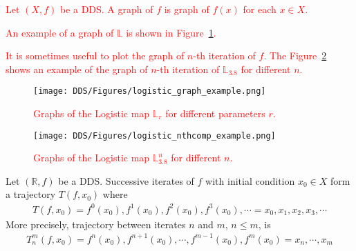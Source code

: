 \begin{definition}[Graph]
\textcolor{red}{
    Let $\left( X, f \right)$ be a DDS. A graph of $f$ is graph of $f(x)$ for each $x \in X$.
}
\end{definition}

\begin{remark}
    \textcolor{red}{
    An example of a graph of $\mathbb{L}$ is shown in Figure~\ref{fig:logistic_graph_example}.
    }
    \par
    \textcolor{red}{
    It is sometimes useful to plot the graph of $n$-th iteration of $f$.
    The Figure~\ref{fig:logistic_nthcomp_example} shows an example of the graph of $n$-th iteration of $\mathbb{L}_{3.8}$ for different $n$.
    }
\end{remark}

\begin{figure}[!h]
    \centering
    \texttt{[image: DDS/Figures/logistic\_graph\_example.png]}
    \caption{
        \textcolor{red}{
        Graphs of the Logistic map $\mathbb{L}_{r}$ for different parameters $r$.
        }
    }
    \label{fig:logistic_graph_example}
\end{figure}

\begin{figure}[!h]
    \centering
    \texttt{[image: DDS/Figures/logistic\_nthcomp\_example.png]}
    \caption{
        \textcolor{red}{
        Graphs of the Logistic map $\mathbb{L}_{3.8}^{n}$ for different $n$.
        }
    }
    \label{fig:logistic_nthcomp_example}
\end{figure}

\begin{definition}[Trajectory]
    Let $\left( \mathbb{R}, f \right)$ be a DDS. Successive iterates of $f$ with initial condition $x_0 \in X$ form a trajectory $T(f, x_0)$ where
    \begin{eqnarray}
        T(f, x_0) = f^0(x_0), f^1(x_0), f^2(x_0), f^3(x_0), \cdots  = x_0, x_1, x_2, x_3, \cdots
    \end{eqnarray}
    More precisely, trajectory between iterates $n$ and $m$, $n \leq m$, is
    \begin{eqnarray}
        T_{n}^{m}(f, x_0) = f^{n}(x_0), f^{n+1}(x_0), \cdots, f^{m-1}(x_0), f^{m}(x_0) = x_n, \cdots, x_m
    \end{eqnarray}
\end{definition}

